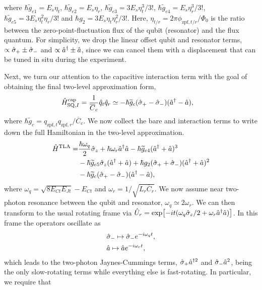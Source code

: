 where $\hbar \widetilde{g}_{e1} =E_{s}\eta_t$, $\hbar \widetilde{g}_{e2} =E_{s}\eta_r$, $\hbar \widetilde{g}_{e3} =3E_{s}\eta_t^3 /3!$, $\hbar \widetilde{g}_{e4} =E_{s}\eta_r^3/3!$, $\hbar \widetilde{g}_{e5}=3E_{s}\eta_t^2 \eta_r/3!$ and $\hbar g_{2}=3E_{s}\eta_t\eta_r^2/3!$. Here, $\eta_{t/r}=2\pi \phi_{\text{zpf},t/r}/\Phi_0$ is the ratio between the zero-point-fluctuation flux of the qubit (resonator) and the flux quantum. For simplicity, we drop the linear offset qubit and resonator terms, $\propto \hat{\sigma}_+ \pm \hat{\sigma}_-$ and $\propto \hat{a}^\dagger \pm \hat{a}$, since we can cancel them with a displacement that can be tuned in situ during the experiment.

Next, we turn our attention to the capacitive interaction term with the goal of obtaining the final two-level approximation form,
\begin{align}
    \hat{H}_{\text{SQ},I}^{\text{cap}}&=\frac{1}{\overline{C}_c}\hat{q}_t \hat{q}_r\simeq-\hbar \widetilde{g}_{c}(\hat{\sigma}_+-\hat{\sigma}_-)(\hat{a}^\dagger - \hat{a}),
\end{align}
where $\hbar \widetilde{g}_{c}={q_{\text{zpf},t}q_{\text{zpf},r}}/{\overline{C}_c}$.
We now collect the bare and interaction terms to write down the full Hamiltonian in the two-level approximation.
\begin{align}\label{eq:TLAHam}
    \hat{H}^{\text{TLA}}=&\frac{\hbar \omega_{q}}{2}\hat{\sigma}_z + \hbar \omega_r \hat{a}^\dagger \hat{a}  - \hbar \widetilde{g}_{e4}(\hat{a}^\dagger + \hat{a})^3 \nonumber\\&- \hbar \widetilde{g}_{e5}\hat{\sigma}_z(\hat{a}^\dagger + \hat{a})+ \hbar g_{2} (\hat{\sigma}_+ + \hat{\sigma}_-)(\hat{a}^\dagger+ \hat{a})^2 \nonumber\\ &- \hbar \widetilde{g}_c(\hat{\sigma}_+ -\hat{\sigma}_-)(\hat{a}^\dagger - \hat{a}),
\end{align}
where $\omega_q=\sqrt{8E_{Ct} E_{Jt}}-E_{Ct}$ and $\omega_r=1/\sqrt{L_r\overline{C}_r}$. 
We now assume near two-photon resonance between the qubit and resonator, $\omega_q \simeq 2 \omega_r$. We can then transform to the usual rotating frame via $\hat{U}_r=\exp[-it(\omega_q \hat{\sigma}_z/2 + \omega_r \hat{a}^\dagger\hat{a})]$. In this frame the operators oscillate as
\begin{align*}
    &\hat{\sigma}_-\mapsto \hat{\sigma}_- e^{-i\omega_q t},\\
    & \hat{a}\mapsto \hat{a} e^{-i\omega_r t},
\end{align*}
which leads to the two-photon Jaynes-Cummings terms, $\hat{\sigma}_+\hat{a}^{\dagger 2}$ and $\hat{\sigma}_-\hat{a}^2$, being the only slow-rotating terms while everything else is fast-rotating. In particular, we require that
